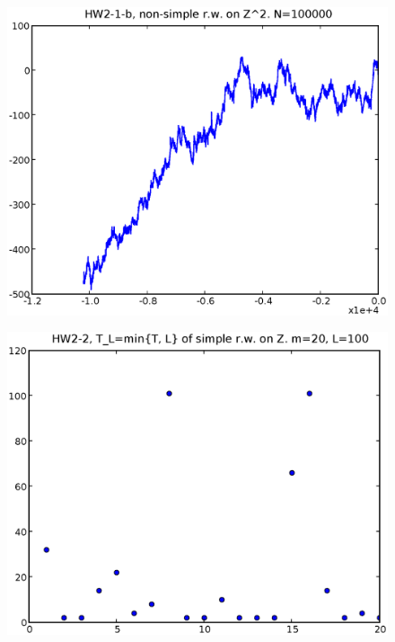 \documentclass[a4paper,10pt]{article}
\begin{document}
\begin{figure}
\includegraphics[width=1\textwidth]{hw2_1_b_N100000.eps}
\caption{}
\end{figure}
\begin{figure}
\includegraphics[width=1\textwidth]{hw2_2_m20L100.eps}
\caption{}
\end{figure}
\end{document}
